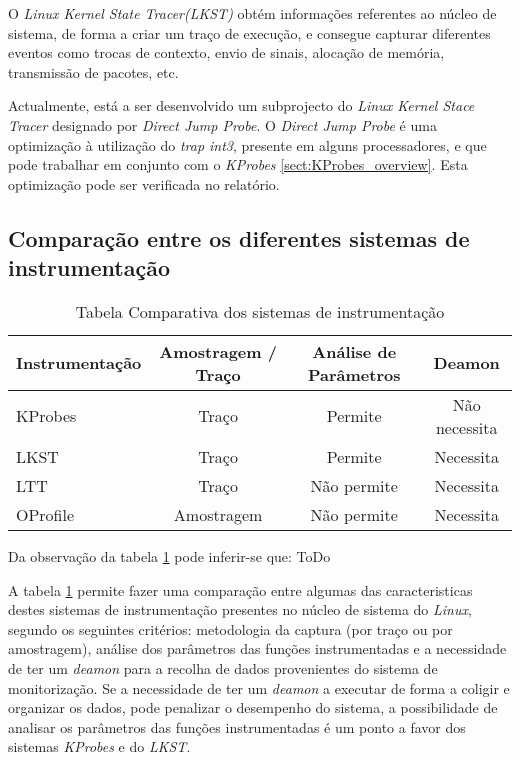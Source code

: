 O \textit{Linux Kernel State Tracer(LKST)} obtém informações referentes ao núcleo de sistema, de forma a criar um traço de execução, e consegue capturar diferentes eventos como trocas de contexto, envio de sinais, alocação de memória, transmissão de pacotes, etc.

\label{cap:djprobe}
Actualmente, está a ser desenvolvido um subprojecto do \textit{Linux Kernel Stace Tracer} designado por \textit{Direct Jump Probe}.
O \textit{Direct Jump Probe} é uma optimização à utilização do \textit{trap int3}, presente em alguns processadores, e que pode trabalhar em conjunto com o \textit{KProbes} \ref{sect:KProbes_overview}.
Esta optimização pode ser verificada no relatório\cite{Hiramatsu2005}.


\subsection{Comparação entre os diferentes sistemas de instrumentação}
\begin{table}[h!]
\begin{center}
\caption{Tabela Comparativa dos sistemas de instrumentação}
\label{tab:inst_compare}
\begin{tabular}{|l||c|c|c|}
\hline
Instrumentação & Amostragem / Traço & Análise de Parâmetros & Deamon \\
\hline
KProbes & Traço & Permite & Não necessita \\
\hline
LKST & Traço & Permite & Necessita \\
\hline
LTT & Traço & Não permite & Necessita \\
\hline
OProfile & Amostragem & Não permite & Necessita \\
\hline

\end{tabular}
\end{center}
\end{table}

Da observação da tabela \ref{tab:inst_compare} pode inferir-se que: ToDo

A tabela \ref{tab:inst_compare} permite fazer uma comparação entre algumas das caracteristicas destes sistemas de instrumentação presentes no núcleo de sistema do \textit{Linux}, segundo os seguintes critérios: metodologia da captura (por traço ou por amostragem), análise dos parâmetros das funções instrumentadas e a necessidade de ter um \textit{deamon} para a recolha de dados provenientes do sistema de monitorização.
Se a necessidade de ter um \textit{deamon} a executar de forma a coligir e organizar os dados, pode penalizar o desempenho do sistema, a possibilidade de analisar os parâmetros das funções instrumentadas é um ponto a favor dos sistemas \textit{KProbes} e do \textit{LKST}.
